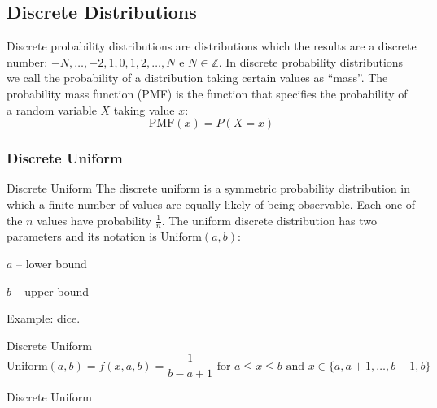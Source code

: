 \subsection*{Discrete Distributions}
\begin{frame}[noframenumbering]
	\begin{defn}
		Discrete probability distributions are distributions which the
		results are a discrete number:
		$-N, \dots, -2, 1, 0,1,2,\dots, N$ e $N \in \mathbb{Z}$.
		In discrete probability distributions we call the probability
		of a distribution taking certain values as ``mass''.
		The probability mass function (PMF) is the function that
		specifies the probability of a random variable $X$ taking value $x$:
		$$\text{PMF}(x) = P(X = x)$$
	\end{defn}
\end{frame}

\subsubsection*{Discrete Uniform}
\begin{frame}[noframenumbering]{Discrete Uniform}
	The discrete uniform is a symmetric probability distribution in which
	a finite number of values are equally likely of being observable.
	Each one of the $n$ values have probability $\frac{1}{n}$.
	\vfill
	The uniform discrete distribution has two parameters and its notation is
	$\text{Uniform}(a, b)$:
	\begin{vfilleditems}
		\item $a$ -- lower bound
		\item $b$ -- upper bound
	\end{vfilleditems}
	\vfill
	Example: dice.
\end{frame}

\begin{frame}[noframenumbering]{Discrete Uniform}
	$$\text{Uniform}(a,b) = f(x, a, b) = \frac{1}{b-a+1} \text{ for $a \leq x \leq b$ and $x\in \{a,a+1,\dots ,b-1,b\}$}$$
\end{frame}

\begin{frame}[noframenumbering]{Discrete Uniform}
	\centering
\end{frame}

